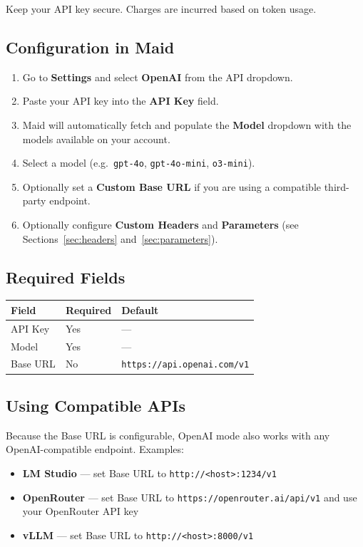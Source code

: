\documentclass[12pt,a4paper]{article}
\begin{document}
Keep your API key secure. Charges are incurred based on token usage.

\subsection{Configuration in Maid}

\begin{enumerate}
    \item Go to \textbf{Settings} and select \textbf{OpenAI} from the API dropdown.
    \item Paste your API key into the \textbf{API Key} field.
    \item Maid will automatically fetch and populate the \textbf{Model} dropdown with the models available on your account.
    \item Select a model (e.g.\ \texttt{gpt-4o}, \texttt{gpt-4o-mini}, \texttt{o3-mini}).
    \item Optionally set a \textbf{Custom Base URL} if you are using a compatible third-party endpoint.
    \item Optionally configure \textbf{Custom Headers} and \textbf{Parameters} (see Sections~\ref{sec:headers} and~\ref{sec:parameters}).
\end{enumerate}

\subsection{Required Fields}

\begin{center}
\begin{tabular}{lll}
\toprule
\textbf{Field} & \textbf{Required} & \textbf{Default} \\
\midrule
API Key  & Yes & — \\
Model    & Yes & — \\
Base URL & No  & \texttt{https://api.openai.com/v1} \\
\bottomrule
\end{tabular}
\end{center}

\subsection{Using Compatible APIs}

Because the Base URL is configurable, OpenAI mode also works with any OpenAI-compatible endpoint. Examples:

\begin{itemize}[noitemsep]
    \item \textbf{LM Studio} — set Base URL to \texttt{http://<host>:1234/v1}
    \item \textbf{OpenRouter} — set Base URL to \texttt{https://openrouter.ai/api/v1} and use your OpenRouter API key
    \item \textbf{vLLM} — set Base URL to \texttt{http://<host>:8000/v1}
\end{itemize}
\end{document}
